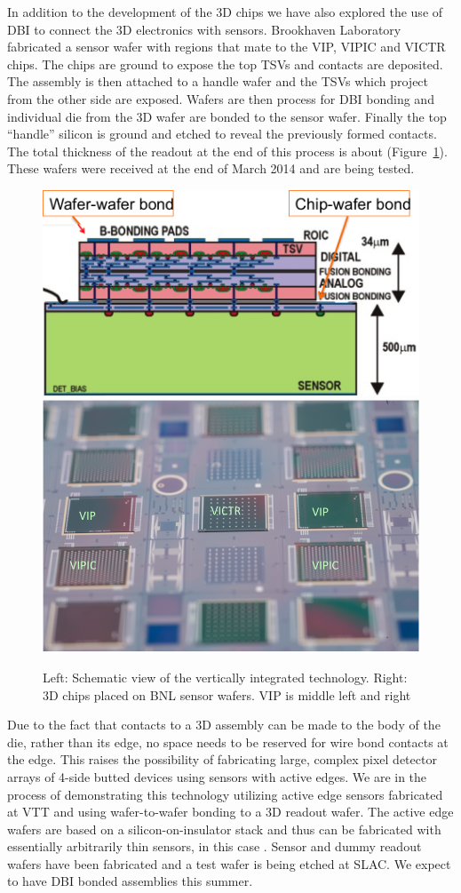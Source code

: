 In addition to the development of the 3D chips we have also explored the use of DBI to connect the 3D electronics with sensors.  Brookhaven Laboratory fabricated a sensor wafer with regions that mate to the VIP, VIPIC and VICTR chips.  The chips are ground to expose the top TSVs and contacts are deposited. The assembly is then attached to a handle wafer and the TSVs which project from the other side are exposed.  Wafers are then process for DBI bonding and individual die from the 3D wafer are bonded to the sensor wafer.  Finally the top ``handle'' silicon is ground and etched to reveal the previously formed contacts.  The total thickness of the readout at the end of this process is about \unit[25]{\micron} (Figure~\ref{fig:VertexDetector:VIP:chipsOnBNLWafer}). These wafers were received at the end of March 2014 and are being tested.

\begin{figure}
    \centering
    \includegraphics[width=.495\textwidth]{VertexDetector/VIP/schematic}
    \includegraphics[width=.495\textwidth]{VertexDetector/VIP/3DChipsOnBNLWafers}
\caption{Left: Schematic view of the vertically integrated technology. Right: 3D chips placed on BNL sensor wafers. VIP is middle left and right}
\label{fig:VertexDetector:VIP:chipsOnBNLWafer}
\end{figure}
Due to the fact that contacts to a 3D assembly can be made to the body of the die, rather than its edge, no space needs to be reserved for wire bond contacts at the edge.  This raises the possibility of fabricating large, complex pixel detector arrays of 4-side butted devices using sensors with active edges.  We are in the process of demonstrating this technology utilizing active edge sensors fabricated at VTT and using wafer-to-wafer bonding to a 3D readout wafer. The active edge wafers are based on a silicon-on-insulator stack and thus can be fabricated with essentially arbitrarily thin sensors, in this case \unit[200]{\micron}. Sensor and dummy readout wafers have been fabricated and a test wafer is being etched at SLAC. We expect to have DBI bonded assemblies this summer.

